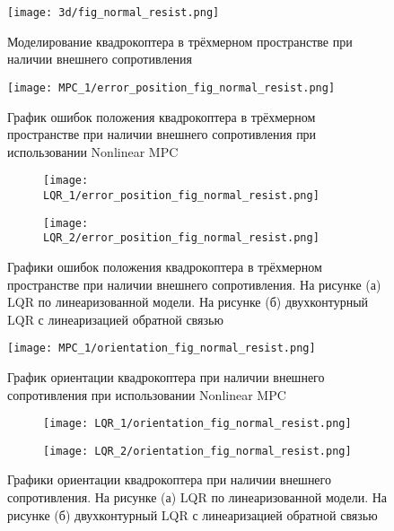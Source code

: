 \begin{figure}[ht]
    \centering
    \texttt{[image: 3d/fig\_normal\_resist.png]}
    \caption{Моделирование квадрокоптера в трёхмерном пространстве при наличии внешнего сопротивления}
    \label{}
\end{figure}



\begin{figure}[ht]
    \centering
    \texttt{[image: MPC\_1/error\_position\_fig\_normal\_resist.png]}
    \caption{График ошибок положения квадрокоптера в трёхмерном пространстве при наличии внешнего сопротивления при использовании Nonlinear MPC}
    \label{}
\end{figure}

\begin{figure}[ht]
	\centering
\hspace*{\fill}%
	\begin{subfigure}[b]{0.49\textwidth}
        \centering
		\texttt{[image: LQR\_1/error\_position\_fig\_normal\_resist.png]}
		\caption{}
		\label{fig:tiger1}
	\end{subfigure}
\hfill
	\begin{subfigure}[b]{0.49\textwidth}
        \centering
		\texttt{[image: LQR\_2/error\_position\_fig\_normal\_resist.png]}
        \caption{}
		\label{fig:tiger2}
	\end{subfigure}
\hspace*{\fill}%
	\caption{Графики ошибок положения квадрокоптера в трёхмерном пространстве при наличии внешнего сопротивления. На рисунке (а) LQR по линеаризованной модели. На рисунке (б) двухконтурный LQR с линеаризацией обратной связью}
	\label{fig:tiger}
\end{figure}

\newpage

\begin{figure}[ht]
    \centering
    \texttt{[image: MPC\_1/orientation\_fig\_normal\_resist.png]}
    \caption{График ориентации квадрокоптера при наличии внешнего сопротивления при использовании Nonlinear MPC}
    \label{}
\end{figure}

\begin{figure}[ht]
	\centering
\hspace*{\fill}%
	\begin{subfigure}[b]{0.49\textwidth}
        \centering
		\texttt{[image: LQR\_1/orientation\_fig\_normal\_resist.png]}
		\caption{}
		\label{fig:tiger1}
	\end{subfigure}
\hfill
	\begin{subfigure}[b]{0.49\textwidth}
        \centering
		\texttt{[image: LQR\_2/orientation\_fig\_normal\_resist.png]}
        \caption{}
		\label{fig:tiger2}
	\end{subfigure}
\hspace*{\fill}%
	\caption{Графики ориентации квадрокоптера при наличии внешнего сопротивления. На рисунке (а) LQR по линеаризованной модели. На рисунке (б) двухконтурный LQR с линеаризацией обратной связью}
	\label{fig:tiger}
\end{figure}

